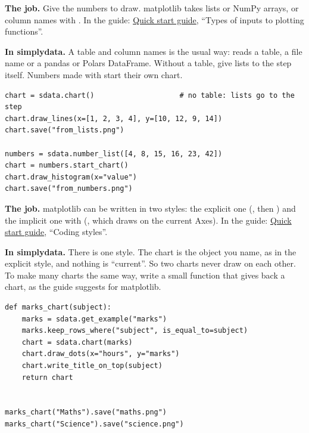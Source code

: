 
\textbf{The job.} Give the numbers to draw. matplotlib takes lists or NumPy arrays, or column names
with . In the guide: \href{https://matplotlib.org/stable/users/explain/quick_start.html}%
{Quick start guide}, ``Types of inputs to plotting functions''.

\textbf{In simplydata.} A table and column names is the usual way:  reads a
table, a file name or a pandas or Polars DataFrame. Without a table, give lists to the step itself.
Numbers made with  start their own chart.

\begin{lstlisting}[style=py]
chart = sdata.chart()                    # no table: lists go to the step
chart.draw_lines(x=[1, 2, 3, 4], y=[10, 12, 9, 14])
chart.save("from_lists.png")

numbers = sdata.number_list([4, 8, 15, 16, 23, 42])
chart = numbers.start_chart()
chart.draw_histogram(x="value")
chart.save("from_numbers.png")
\end{lstlisting}


\textbf{The job.} matplotlib can be written in two styles: the explicit one (, then ) and the implicit one with 
(, which draws on the current Axes). In the guide:
\href{https://matplotlib.org/stable/users/explain/quick_start.html}{Quick start guide}, ``Coding
styles''.

\textbf{In simplydata.} There is one style. The chart is the object you name, as in the explicit style,
and nothing is ``current''. So two charts never draw on each other. To make many charts the same way,
write a small function that gives back a chart, as the guide suggests for matplotlib.

\begin{lstlisting}[style=py]
def marks_chart(subject):
    marks = sdata.get_example("marks")
    marks.keep_rows_where("subject", is_equal_to=subject)
    chart = sdata.chart(marks)
    chart.draw_dots(x="hours", y="marks")
    chart.write_title_on_top(subject)
    return chart


marks_chart("Maths").save("maths.png")
marks_chart("Science").save("science.png")
\end{lstlisting}

